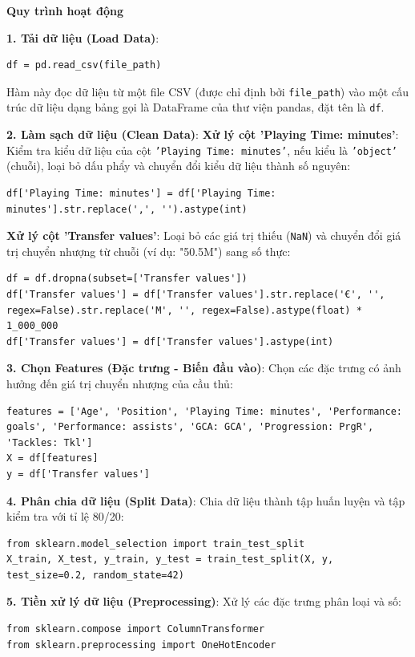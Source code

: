 \documentclass[12pt]{report}
\begin{document}
{\textbf{Quy trình hoạt động}

\textbf{1. Tải dữ liệu (Load Data)}:
\begin{verbatim}
df = pd.read_csv(file_path)
\end{verbatim}
Hàm này đọc dữ liệu từ một file CSV (được chỉ định bởi \texttt{file\_path}) vào một cấu trúc dữ liệu dạng bảng gọi là DataFrame của thư viện pandas, đặt tên là \texttt{df}.

\textbf{2. Làm sạch dữ liệu (Clean Data)}:
\textbf{Xử lý cột 'Playing Time: minutes'}:
Kiểm tra kiểu dữ liệu của cột \texttt{'Playing Time: minutes'}, nếu kiểu là \texttt{'object'} (chuỗi), loại bỏ dấu phẩy và chuyển đổi kiểu dữ liệu thành số nguyên:
\begin{verbatim}
df['Playing Time: minutes'] = df['Playing Time: minutes'].str.replace(',', '').astype(int)
\end{verbatim}

\textbf{Xử lý cột 'Transfer values'}:
Loại bỏ các giá trị thiếu (\texttt{NaN}) và chuyển đổi giá trị chuyển nhượng từ chuỗi (ví dụ: "\€50.5M") sang số thực:
\begin{verbatim}
df = df.dropna(subset=['Transfer values'])
df['Transfer values'] = df['Transfer values'].str.replace('€', '', regex=False).str.replace('M', '', regex=False).astype(float) * 1_000_000
df['Transfer values'] = df['Transfer values'].astype(int)
\end{verbatim}

\textbf{3. Chọn Features (Đặc trưng - Biến đầu vào)}:
Chọn các đặc trưng có ảnh hưởng đến giá trị chuyển nhượng của cầu thủ:
\begin{verbatim}
features = ['Age', 'Position', 'Playing Time: minutes', 'Performance: goals', 'Performance: assists', 'GCA: GCA', 'Progression: PrgR', 'Tackles: Tkl']
X = df[features]
y = df['Transfer values']
\end{verbatim}

\textbf{4. Phân chia dữ liệu (Split Data)}:
Chia dữ liệu thành tập huấn luyện và tập kiểm tra với tỉ lệ 80/20:
\begin{verbatim}
from sklearn.model_selection import train_test_split
X_train, X_test, y_train, y_test = train_test_split(X, y, test_size=0.2, random_state=42)
\end{verbatim}

\textbf{5. Tiền xử lý dữ liệu (Preprocessing)}:
Xử lý các đặc trưng phân loại và số:
\begin{verbatim}
from sklearn.compose import ColumnTransformer
from sklearn.preprocessing import OneHotEncoder


\end{verbatim}}
\end{document}
